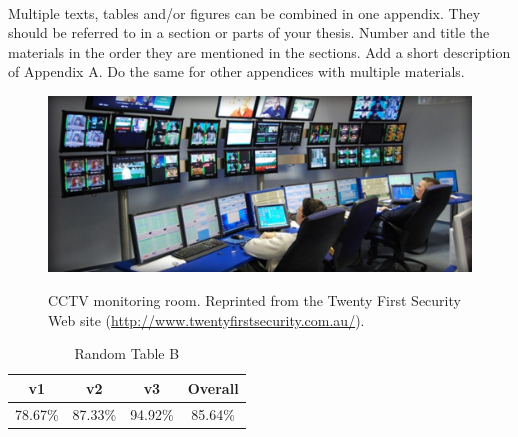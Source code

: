 
\setlength{\parindent}{0pt}
\setlength{\parskip}{1em}
\setlength{\baselineskip}{1.5em}

\renewcommand{\thefigure}{B\arabic{figure}}
\renewcommand{\thetable}{B\arabic{table}}

\begin{center}
  \fontsize{14}{17}\\
  \fontsize{14}{25}
\end{center}

Multiple texts, tables and/or figures can be combined in one appendix.  They should be referred to in a section or parts of your thesis. Number and title the materials in the order they are mentioned in the sections. Add a short description of Appendix A.  Do the same for other appendices with multiple materials.

\begin{figure}[ht]
  \centering
  \caption[CCTV monitoring room in Appendix B.]{CCTV monitoring room. Reprinted from the Twenty First Security Web site (\url{http://www.twentyfirstsecurity.com.au/}).}
  \includegraphics[width=5in]{figures/monitoring}
  \label{fig:monitoring-test}
\end{figure}

\begin{table}[ht]
  \caption[Random Table B]{Random Table B}
  \begin{center}
    \begin{tabular}{cccc}
      \hline \textbf{v1} & \textbf{v2} & \textbf{v3} & \textbf{Overall} \\ \hline
        78.67\% & 87.33\% & 94.92\% & 85.64\% \\ \hline
    \end{tabular}
  \end{center}
  \label{tab:random_table_B}
\end{table} 